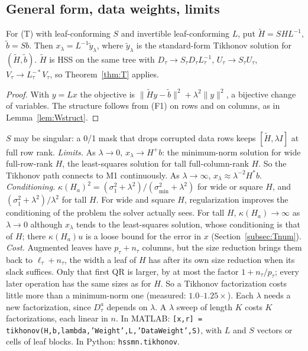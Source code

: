 \subsection{General form, data weights, limits}
\begin{proposition}\label{prop:general}
For (T) with leaf-conforming $S$ and invertible leaf-conforming $L$, put $\tilde H=SHL^{-1}$,
$\tilde b=Sb$. Then $x_\lambda=L^{-1}\tilde y_\lambda$, where $\tilde y_\lambda$ is the standard-form
Tikhonov solution for $(\tilde H,\tilde b)$. $\tilde H$ is HSS on the same tree with
$D_\tau\to S_\tau D_\tau L_\tau^{-1}$, $U_\tau\to S_\tau U_\tau$, $V_\tau\to L_\tau^{-*}V_\tau$, so
Theorem~\ref{thm:T} applies.
\end{proposition}
\begin{proof}
With $y=Lx$ the objective is $\|\tilde H y-\tilde b\|^2+\lambda^2\|y\|^2$, a bijective change of
variables. The structure follows from (F1) on rows and on columns, as in Lemma~\ref{lem:Wstruct}.
\end{proof}
$S$ may be singular: a 0/1 mask that drops corrupted data rows keeps $[\tilde H,\lambda I]$ at full row rank.
\emph{Limits.} As $\lambda\to0$, $x_\lambda\to H^+b$: the minimum-norm solution for wide full-row-rank $H$,
the least-squares solution for tall full-column-rank $H$. So the Tikhonov path connects to M1
continuously. As $\lambda\to\infty$, $x_\lambda\approx\lambda^{-2}H^*b$.
\emph{Conditioning.} $\kappa(H_a)^2=(\sigma_1^2+\lambda^2)/(\sigma_{\min}^2+\lambda^2)$ for wide or square $H$,
and $(\sigma_1^2+\lambda^2)/\lambda^2$ for tall $H$. For wide and square $H$, regularization improves the
conditioning of the problem the solver actually sees. For tall $H$, $\kappa(H_a)\to\infty$ as
$\lambda\to0$ although $x_\lambda$ tends to the least-squares solution, whose conditioning is that of
$H$; there $\kappa(H_a)u$ is a loose bound for the error in $x$ (Section~\ref{subsec:Tnum}).
\emph{Cost.} Augmented leaves have $p_\tau+n_\tau$ columns, but the size reduction brings them back to
$\ell_\tau+n_\tau$, the width a leaf of $H$ has after its own size reduction when its slack suffices. Only that first QR is
larger, by at most the factor $1+n_\tau/p_\tau$; every later operation has the same sizes as for $H$.
So a Tikhonov factorization costs little more than a minimum-norm one (measured: $1.0$--$1.25\times$).
Each $\lambda$ needs a new factorization, since $D_\tau^a$ depends on $\lambda$. A $\lambda$ sweep of
length $K$ costs $K$ factorizations, each linear in $n$.
In MATLAB: \texttt{[x,r] = tikhonov(H,b,lambda,'Weight',L,'DataWeight',S)}, with $L$ and $S$ vectors or
cells of leaf blocks. In Python: \texttt{hssmn.tikhonov}.
